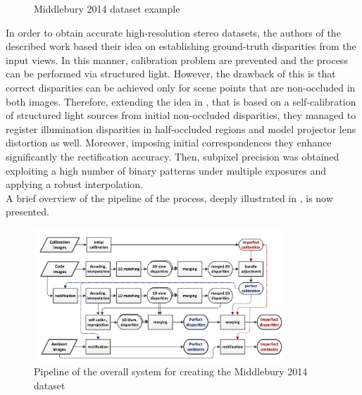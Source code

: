 \begin{figure}[t]
	\centering
\caption{Middlebury 2014 dataset example}
\label{fig:dataset-example}
\end{figure}

In order to obtain accurate high-resolution stereo datasets, the authors of the described work based their idea on establishing ground-truth disparities from the input views.
In this manner, calibration problem are prevented and the process can be performed via structured light.
However, the drawback of this is that correct disparities can be achieved only for scene points that are non-occluded in both images.
Therefore, extending the idea in \cite{scharstein2003high}, that is based on a self-calibration of structured light sources from initial non-occluded disparities, they managed to register illumination disparities in half-occluded regions and model projector lens distortion as well. 
Moreover, imposing initial correspondences they enhance significantly the rectification accuracy.
Then, subpixel precision was obtained exploiting a high number of binary patterns under multiple exposures and applying a robust interpolation.\\
A brief overview of the pipeline of the process, deeply illustrated in \cite{Scharstein2014}, is now presented.\\

\begin{figure}[t]
	\begin{center}
		\includegraphics[width=.8\textwidth, height=5cm, keepaspectratio]{images/middlebury-2014-pipeline.png}
		\caption{Pipeline of the overall system for creating the Middlebury 2014 dataset \cite{Scharstein2014}}
		\label{fig:middleury-pipeline}
	\end{center}
\end{figure}

